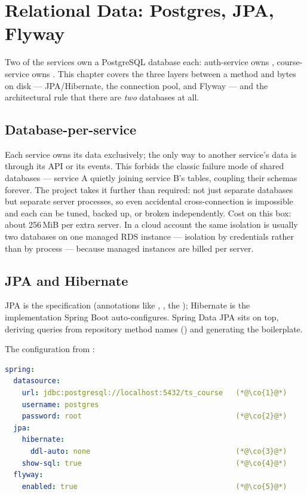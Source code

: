 \chapter{Relational Data: Postgres, JPA, Flyway}
\label{ch:postgres}

Two of the services own a PostgreSQL database each: auth-service owns
, course-service owns . This chapter
covers the three layers between a  method and bytes on
disk --- JPA/Hibernate, the connection pool, and Flyway --- and the
architectural rule that there are \emph{two} databases at all.

\section{Database-per-service}

\begin{decision}
Each service owns its data exclusively; the only way to another service's
data is through its API or its events. This forbids the classic failure
mode of shared databases --- service A quietly joining service B's tables,
coupling their schemas forever. The project takes it further than
required: not just separate databases but separate server processes, so
even accidental cross-connection is impossible and each can be tuned,
backed up, or broken independently. Cost on this box: about 256\,MiB per
extra server. In a cloud account the same isolation is usually two
databases on one managed RDS instance --- isolation by credentials rather
than by process --- because managed instances are billed per server.
\end{decision}

\section{JPA and Hibernate}

JPA is the specification (annotations like ,
, the ); Hibernate is the
implementation Spring Boot auto-configures. Spring Data JPA sits on top,
deriving queries from repository method names
() and generating the boilerplate.

The configuration from :

\begin{lstlisting}[language=yaml]
spring:
  datasource:
    url: jdbc:postgresql://localhost:5432/ts_course   (*@\co{1}@*)
    username: postgres
    password: root                                    (*@\co{2}@*)
  jpa:
    hibernate:
      ddl-auto: none                                  (*@\co{3}@*)
    show-sql: true                                    (*@\co{4}@*)
  flyway:
    enabled: true                                     (*@\co{5}@*)
\end{lstlisting}

